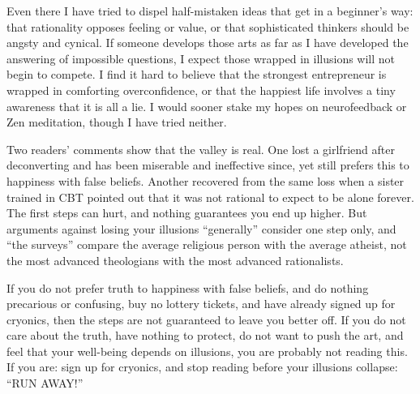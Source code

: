 Even there I have tried to dispel half-mistaken ideas that get in a beginner's way: that rationality opposes feeling or value, or that sophisticated thinkers should be angsty and cynical. If someone develops those arts as far as I have developed the answering of impossible questions, I expect those wrapped in illusions will not begin to compete. I find it hard to believe that the strongest entrepreneur is wrapped in comforting overconfidence, or that the happiest life involves a tiny awareness that it is all a lie. I would sooner stake my hopes on neurofeedback or Zen meditation, though I have tried neither. 

Two readers' comments show that the valley is real. One lost a girlfriend after deconverting and has been miserable and ineffective since, yet still prefers this to happiness with false beliefs. Another recovered from the same loss when a sister trained in CBT pointed out that it was not rational to expect to be alone forever. The first steps can hurt, and nothing guarantees you end up higher. But arguments against losing your illusions ``generally'' consider one step only, and ``the surveys'' compare the average religious person with the average atheist, not the most advanced theologians with the most advanced rationalists. 

If you do not prefer truth to happiness with false beliefs, and do nothing precarious or confusing, buy no lottery tickets, and have already signed up for cryonics, then the steps are not guaranteed to leave you better off. If you do not care about the truth, have nothing to protect, do not want to push the art, and feel that your well-being depends on illusions, you are probably not reading this. If you are: sign up for cryonics, and stop reading before your illusions collapse: ``RUN AWAY!'' 
